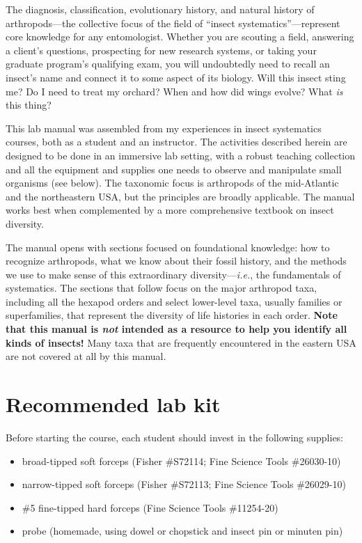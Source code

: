 The diagnosis, classification, evolutionary history, and natural history of arthropods---the collective focus of the field of ``insect systematics''---represent core knowledge for any entomologist. Whether you are scouting a field, answering a client's questions, prospecting for new research systems, or taking your graduate program's qualifying exam, you will undoubtedly need to recall an insect's name and connect it to some aspect of its biology. Will this insect sting me? Do I need to treat my orchard? When and how did wings evolve? What \textit{is} this thing?

This lab manual was assembled from my experiences in insect systematics courses, both as a student and an instructor. The activities described herein are designed to be done in an immersive lab setting, with a robust teaching collection and all the equipment and supplies one needs to observe and manipulate small organisms (see below). The taxonomic focus is arthropods of the mid-Atlantic and the northeastern USA, but the principles are broadly applicable. The manual works best when complemented by a more comprehensive textbook on insect diversity.

The manual opens with sections focused on foundational knowledge: how to recognize arthropods, what we know about their fossil history, and the methods we use to make sense of this extraordinary diversity---\textit{i.e.}, the fundamentals of systematics. The sections that follow focus on the major arthropod taxa, including all the hexapod orders and select lower-level taxa, usually families or superfamilies, that represent the diversity of life histories in each order. \textbf{Note that this manual is \textit{not} intended as a resource to help you identify all kinds of insects!} Many taxa that are frequently encountered in the eastern USA are not covered at all by this manual. 

\section*{Recommended lab kit}
Before starting the course, each student should invest in the following supplies:
\begin{itemize}
    \item broad-tipped soft forceps (Fisher \#S72114; Fine Science Tools \#26030-10)
    \item narrow-tipped soft forceps (Fisher \#S72113; Fine Science Tools \#26029-10)
    \item \#5 fine-tipped hard forceps (Fine Science Tools \#11254-20)
    \item probe (homemade, using dowel or chopstick and insect pin or minuten pin)
\end{itemize}

